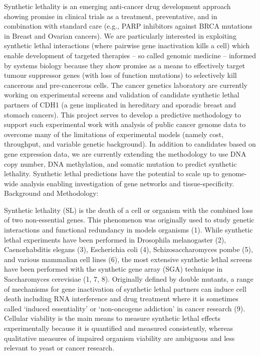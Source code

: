 Synthetic lethality is an emerging anti-cancer drug development approach showing promise in clinical trials as a treatment, preventative, and in combination with standard care (e.g., PARP inhibitors against BRCA mutations in Breast and Ovarian cancers). We are particularly interested in exploiting synthetic lethal interactions (where pairwise gene inactivation kills a cell) which enable development of targeted therapies – so called genomic medicine – informed by systems biology because they show promise as a means to effectively target tumour suppressor genes (with loss of function mutations) to selectively kill cancerous and pre-cancerous cells. The cancer genetics laboratory are currently working on experimental screens and validation of candidate synthetic lethal partners of CDH1 (a gene implicated in hereditary and sporadic breast and stomach cancers). This project serves to develop a predictive methodology to support such experimental work with analysis of public cancer genome data to overcome many of the limitations of experimental models (namely cost, throughput, and variable genetic background). In addition to candidates based on gene expression data, we are currently extending the methodology to use DNA copy number, DNA methylation, and somatic mutation to predict synthetic lethality. Synthetic lethal predictions have the potential to scale up to genome-wide analysis enabling investigation of gene networks and tissue-specificity.
Background and Methodology:

Synthetic lethality (SL) is the death of a cell or organism with the combined loss of two non-essential genes. This phenomenon was originally used to study genetic interactions and functional redundancy in models organisms (1). While synthetic lethal experiments have been performed in Drosophila melanogaster (2), Caenorhabditis elegans (3), Escherichia coli (4), Schizosaccharomyces pombe (5), and various mammalian cell lines (6), the most extensive synthetic lethal screens have been performed with the synthetic gene array (SGA) technique in Saccharomyces cerevisiae (1, 7, 8). Originally defined by double mutants, a range of mechanisms for gene inactivation of synthetic lethal partners can induce cell death including RNA interference and drug treatment where it is sometimes called ‘induced essentiality’ or ‘non-oncogene addiction’ in cancer research (9). Cellular viability is the main means to measure synthetic lethal effects experimentally because it is quantified and measured consistently, whereas qualitative measures of impaired organism viability are ambiguous and less relevant to yeast or cancer research.

